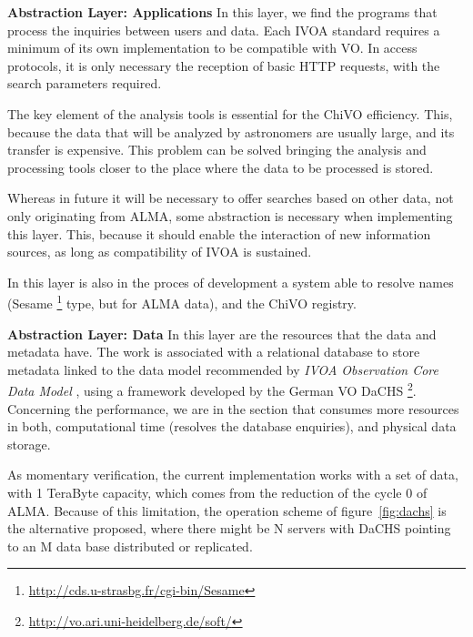 \documentclass[]{spie}
\begin{document}
\textbf{Abstraction Layer:  Applications}
In this layer, we find the programs that process the inquiries between users
and data.  Each IVOA standard requires a minimum of its own implementation to
be compatible with VO.  In access protocols, it is only necessary the reception
of basic HTTP requests, with the search parameters required.

The key element of the analysis tools is essential for the ChiVO efficiency.
This, because the data that will be analyzed by astronomers are usually large,
and its transfer is expensive.  This problem can be solved bringing the
analysis and processing tools closer to the place where the data to be
processed is stored.

Whereas in future it will be necessary to offer searches based on other data,
not only originating from ALMA, some abstraction is necessary when implementing
this layer.  This, because it should enable the interaction of new information
sources, as long as compatibility of IVOA is sustained.

In this layer is also in the proces of development a system able to resolve
names (Sesame \footnote{\url{http://cds.u-strasbg.fr/cgi-bin/Sesame}} type, but
for ALMA data), and the ChiVO registry.


\textbf{Abstraction Layer: Data}
In this layer are the resources that the data and metadata have.  The work is
associated with a relational database to store metadata linked to the data
model recommended by \emph{IVOA Observation Core Data Model}
\cite{louys2011ivoa}, using a framework developed by the German VO DaCHS
\footnote{\url{http://vo.ari.uni-heidelberg.de/soft/}}.  Concerning the
performance, we are in the section that consumes more resources in both,
computational time (resolves the database enquiries), and physical data
storage.  

As momentary verification, the current implementation works with a set of data,
with 1 TeraByte capacity, which comes from the reduction of the cycle 0 of
ALMA.  Because of this limitation, the operation scheme of
figure~\ref{fig:dachs} is the alternative proposed, where there might be N
servers with DaCHS pointing to an M data base distributed or replicated.
\end{document}
